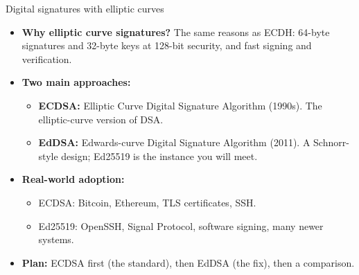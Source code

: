 \ifdefined\PRESENTATION\else\PassOptionsToClass{handout}{beamer}\fi\documentclass[aspectratio=169, lualatex]{beamer}
\begin{document}
\begin{frame}{Digital signatures with elliptic curves}
	\begin{itemize}[<+->]
		\item \textbf{Why elliptic curve signatures?} The same reasons as ECDH: 64-byte signatures and 32-byte keys at 128-bit security, and fast signing and verification.
		\item \textbf{Two main approaches:}
		      \begin{itemize}
			      \item \textbf{ECDSA:} Elliptic Curve Digital Signature Algorithm (1990s). The elliptic-curve version of DSA.
			      \item \textbf{EdDSA:} Edwards-curve Digital Signature Algorithm (2011). A Schnorr-style design; Ed25519 is the instance you will meet.
		      \end{itemize}
		\item \textbf{Real-world adoption:}
		      \begin{itemize}
			      \item ECDSA: Bitcoin, Ethereum, TLS certificates, SSH.
			      \item Ed25519: OpenSSH, Signal Protocol, software signing, many newer systems.
		      \end{itemize}
		\item \textbf{Plan:} ECDSA first (the standard), then EdDSA (the fix), then a comparison.
	\end{itemize}
\end{frame}
\end{document}

